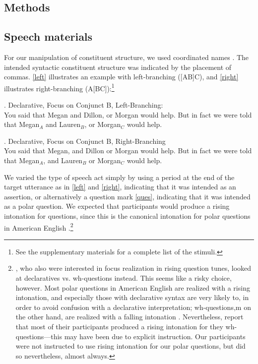 \documentclass[preprint,review,12pt,authoryear,times]{elsarticle}
\begin{document}
\subsection{Methods}

\subsection{Speech materials}

For our manipulation of constituent structure, we used coordinated names \citep[following][]{lehis73, vanden92, wagner05recursion, fery10b,kentn13,petro17}. The intended syntactic constituent structure was indicated by the placement of commas.  \ref{left} illustrates an example with left-branching ([AB]C), and \ref{right} illustrates right-branching (A[BC]):\footnote{See the supplementary materials for a complete list of the stimuli.}

\ex. Declarative, Focus on Conjunct B, Left-Branching:\\
 {\footnotesize You said that Megan and Dillon, or Morgan would help. But in fact we were told that Megan$_A$ and Lauren$_B$, or Morgan$_C$ would help.}\label{left}
 
\ex. Declarative,  Focus on Conjunct B, Right-Branching\\
 {\footnotesize You said that Megan, and Dillon or Morgan would help. But in fact we were told that Megan$_A$, and Lauren$_B$ or Morgan$_C$ would help.}\label{right}
 
We varied the type of speech act simply by using a period at the end of the target utterance as in \ref{left} and \ref{right}, indicating that it was intended as an assertion, or alternatively a question mark \ref{ques}, indicating that it was intended as a polar question. We expected that participants would produce a rising intonation for questions, since this is the canonical intonation for polar questions in American English \citep{ladd08, hedberg2010prosody}.\footnote{\citet{eady86}, who also were interested in focus realization in rising question tunes, looked at declaratives vs. wh-questions instead. This seems like a risky choice, however. Most polar questions in American English are realized with a rising intonation, and especially those with declarative syntax are very likely to, in order to avoid confusion with a declarative interpretation; wh-questions,m on the other hand, are realized with a falling intonation \citep{hedberg2010prosody}. Nevertheless, \citet{eady86} report that most of their participants produced a rising intonation for they wh-questions---this may have been due to explicit instruction. Our participants were not instructed to use rising intonation for our polar questions, but did so nevertheless, almost always.}
\end{document}
